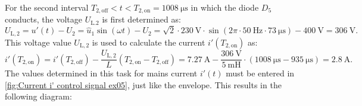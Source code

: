 \begin{solutionblock}
     For the second interval $T_\mathrm{2,off} < t < T_\mathrm{2,on} = \SI{1008}{\micro\s}$ in which the diode $D_\mathrm{5}$ conducts, the voltage $U_\mathrm{L.2}$ is first determined as:
     \begin{equation}
        U_\mathrm{L,2} = u'(t) - U_\mathrm{2}= \hat u_\mathrm{1} \sin(\omega t) - U_\mathrm{2} = \sqrt{2} \cdot \SI{230}{\volt} \cdot \sin(2\pi \cdot \SI{50}{\hertz}\cdot \SI{73}{\micro\s}) - \SI{400}{\volt} = \SI{306}{\volt}.
    \end{equation}
    This voltage value  $U_\mathrm{L,2}$ is used to calculate the current  $i'(T_\mathrm{2,on})$ as:
    \begin{equation}
        i'(T_\mathrm{2,on}) = i'(T_\mathrm{2,off}) -\frac{ U_\mathrm{L,2}}{L}(T_\mathrm{2,on}-T_\mathrm{2,off}) = \SI{7.27}{\ampere} -\frac{\SI{306}{\volt}}{\SI{5}{\milli\henry}}\cdot (\SI{1008}{\micro\s}-\SI{935}{\micro\s}) = \SI{2.8}{\ampere}.
    \end{equation}
    The values determined in this task for mains current
    $i'(t)$ must be entered in \autoref{fig:Current i' control signal ex05}, just like the envelope. This results in the following diagram:
\end{solutionblock}





